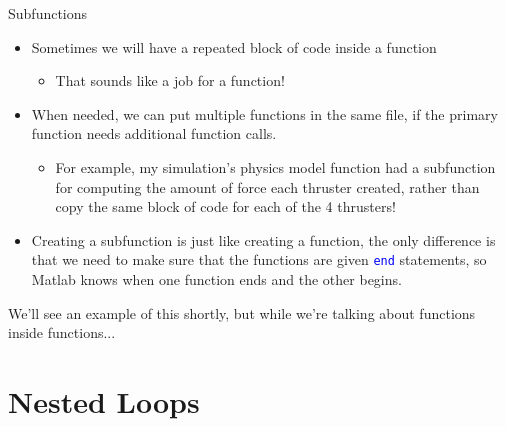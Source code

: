 {}\documentclass[letterpaper,
compress,
xcolor=x11names,
]{beamer}
\begin{document}
\begin{frame}{Subfunctions}
	\footnotesize
	\begin{itemize}
		\item Sometimes we will have a repeated block of code inside a function
		\begin{itemize}
			\item That sounds like a job for a function!
		\end{itemize}
		\item When needed, we can put multiple functions in the same file, if the primary function needs additional function calls.
		\begin{itemize}
			\item For example, my simulation's physics model function had a subfunction for computing the amount of force each thruster created, rather than copy the same block of code for each of the 4 thrusters!
		\end{itemize}
		\item Creating a subfunction is just like creating a function, the only difference is that we need to make sure that the functions are given \textcolor{blue}{\texttt{end}} statements, so Matlab knows when one function ends and the other begins.
	\end{itemize}

	We'll see an example of this shortly, but while we're talking about functions inside functions...
\end{frame}

\section{Nested Loops}
\end{document}
